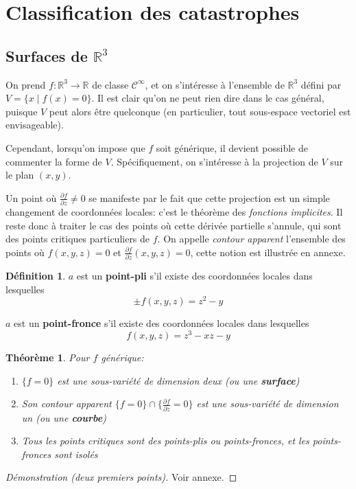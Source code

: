 \documentclass[a4paper]{article}
\newcommand{\cinf}{\mathcal{C}^\infty}
\newcommand{\R}{\mathbb{R}}
\newtheorem{thm}{Théorème}
\theoremstyle{definition}
\newtheorem{defn}{Définition}
\begin{document}
\section{Classification des catastrophes}
\subsection{Surfaces de $\R^3$}

On prend $f: \R^3\to\R$ de classe $\cinf$, et on s'intéresse à l'ensemble de $\R^3$ défini par $V=\{x\mid f(x)=0\}$.
Il est clair qu'on ne peut rien dire dans le cas général, puisque $V$ peut alors être quelconque (en particulier, tout sous-espace vectoriel est envisageable).

Cependant, lorsqu'on impose que $f$ soit générique, il devient possible de commenter la forme de $V$.
Spécifiquement, on s'intéresse à la projection de $V$ sur le plan $(x,y)$.

Un point où $\frac{\partial f}{\partial z}\neq 0$ se manifeste par le fait que cette projection est un simple changement de coordonnées locales: c'est le théorème des \textit{fonctions implicites}.
Il reste donc à traiter le cas des points où cette dérivée partielle s'annule, qui sont des points critiques particuliers de $f$.
On appelle \textit{contour apparent} l'ensemble des points où $f(x,y,z)=0$ et $\frac{\partial f}{\partial z}(x,y,z)=0$, cette notion est illustrée en annexe.
\begin{defn}
	$a$ est un \textbf{point-pli} s'il existe des coordonnées locales dans lesquelles
	$$\pm f(x, y, z) = z^2 - y$$

	$a$ est un \textbf{point-fronce} s'il existe des coordonnées locales dans lesquelles
	$$f(x,y,z) = z^3 - xz - y$$
\end{defn}
\begin{thm}
	Pour $f$ générique:
	\begin{enumerate}
		\item $\{f=0\}$ est une sous-variété de dimension deux (ou une \textbf{surface})
		\item Son contour apparent $\{f=0\}\cap \{\frac{\partial f}{\partial z}=0\}$ est une sous-variété de dimension un (ou une \textbf{courbe})
		\item Tous les points critiques sont des points-plis ou points-fronces, et les points-fronces sont isolés
	\end{enumerate}
\end{thm}
\begin{proof}[Démonstration (deux premiers points)] Voir annexe. \end{proof}
\end{document}
